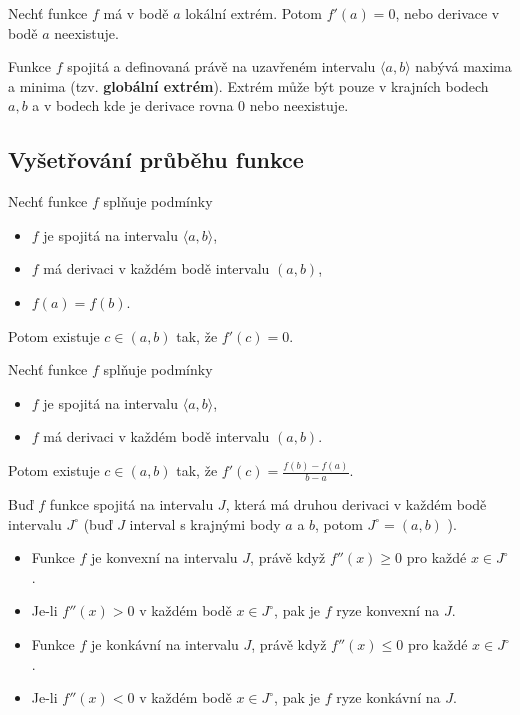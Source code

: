  Nechť funkce $f$ má v bodě $a$ lokální extrém. Potom $f' (a) = 0$, nebo derivace v bodě $a$ neexistuje.

 Funkce $f$ spojitá a definovaná právě na uzavřeném intervalu $\langle a, b\rangle$ nabývá maxima a minima (tzv. \textbf{globální extrém}). Extrém může být pouze v krajních bodech $a, b$ a v bodech kde je derivace rovna 0 nebo neexistuje.

\subsection{Vyšetřování průběhu funkce}

\theorem[Rolleova] Nechť funkce $f$ splňuje podmínky
\vspace{-5pt}
\begin{itemize}
	\item $f$ je spojitá na intervalu $\langle a,b \rangle$,
	\item $f$ má derivaci v každém bodě intervalu $(a,b)$,
	\item $f(a)=f(b)$.
\end{itemize}
\vspace{-5pt}
Potom existuje $c\in(a,b)$ tak, že $f'(c)=0$.

\theorem[Lagrangeova] Nechť funkce $f$ splňuje podmínky
\vspace{-5pt}
\begin{itemize}
	\item $f$ je spojitá na intervalu $\langle a,b \rangle$,
	\item $f$ má derivaci v každém bodě intervalu $(a,b)$.
\end{itemize}
\vspace{-5pt}
Potom existuje $c\in(a,b)$ tak, že $f'(c)=\frac{f(b)-f(a)}{b-a}$.

\theorem Buď $f$ funkce spojitá na intervalu $J$, která má druhou derivaci v každém bodě intervalu $J^{\circ}$ (buď $J$ interval s krajnými body $a$ a $b$, potom $J^{\circ}=(a,b)$ ).
\vspace{-5pt}
\begin{itemize}
	\item Funkce $f$ je konvexní na intervalu $J$, právě když $f''(x) \geq 0$ pro každé $x \in J^{\circ}$.
	\item Je-li $f''(x) > 0$ v každém bodě $x \in J^{\circ}$, pak je $f$ ryze konvexní na $J$.
	\item Funkce $f$ je konkávní na intervalu $J$, právě když $f''(x) \leq 0$ pro každé $x \in J^{\circ}$.
	\item Je-li $f''(x) < 0$ v každém bodě $x \in J^{\circ}$, pak je $f$ ryze konkávní na $J$.
\end{itemize}
\vspace{-5pt}


